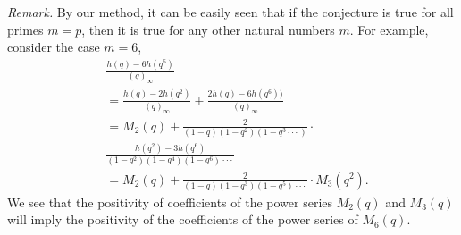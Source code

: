 \documentclass[11pt,reqno]{amsart}
\theoremstyle{definition}
\numberwithin{equation}{section}
\begin{document}
{\it Remark.}
By our method, it can be easily seen that if the conjecture is true for all primes $m=p$, then it is true for any other natural numbers $m$. For example, consider the case $m=6$, 
\begin{equation*} \label{1}
\begin{aligned}
&\frac{h(q)-6h(q^{6})}{(q)_{\infty}}\\
& = \frac{h(q)-2h(q^{2})}{(q)_{\infty}}+\frac{2h(q)-6h(q^{6}))}{(q)_{\infty}}\\
&=M_{2}(q)+\frac{2}{(1-q)(1-q^{2})(1-q^{3}\cdot\cdot\cdot)}\cdot \\
&\frac{h(q^{2})-3h(q^{6})}{(1-q^{2})(1-q^{4})(1-q^{6})\cdot\cdot\cdot}\\
&=M_{2}(q) + \frac{2}{(1-q)(1-q^{3})(1-q^{5})\cdot\cdot\cdot}\cdot M_{3}(q^{2}).
\end{aligned}
\end{equation*}
\noindent We see that the positivity of coefficients of the power series $M_{2}(q)$ and $M_{3}(q)$ will imply the positivity of the coefficients of the power series of $M_{6}(q)$. 
\end{document}
